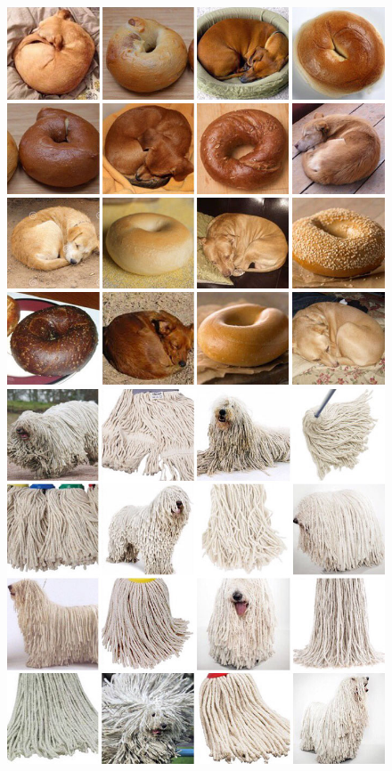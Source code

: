 \documentclass[a4paper, oneside]{discothesis}
\begin{document}
\begin{figure}[th]
	\centering
	\begin{minipage}[t]{0.24\textwidth}\centering\includegraphics[width=\textwidth]{figures/dog-vs-bagel.jpeg}\end{minipage}
	\hfill
	\begin{minipage}[t]{0.24\textwidth}\centering\includegraphics[width=\textwidth]{figures/dog-vs-mop.jpeg}\end{minipage}

\end{figure}
\end{document}
